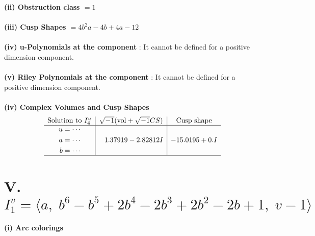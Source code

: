 \documentclass[1p]{elsarticle_modified}
\theoremstyle{definition}
\newcommand{\I}{\sqrt{-1}}
\begin{document}
\flushleft \textbf{(ii) Obstruction class $= 1$}\\~\\
\flushleft \textbf{(iii) Cusp Shapes $= 4 b^2 a-4 b+4 a-12$}\\~\\
\flushleft \textbf{(iv) u-Polynomials at the component} : It cannot be defined for a positive dimension component.\\~\\
\flushleft \textbf{(v) Riley Polynomials at the component} : It cannot be defined for a positive dimension component.\\~\\
\newpage\flushleft \textbf{(iv) Complex Volumes and Cusp Shapes}
$$\begin{array}{c|c|c} 
\text{Solution to }I^u_{4}& \I (\text{vol} + \sqrt{-1}CS) & \text{Cusp shape}\\
 \hline 
\begin{aligned}
u &= \cdots \\
a &= \cdots \\
b &= \cdots\end{aligned}
 & \phantom{-}1.37919 - 2.82812 I & -15.0195 + 0. I\\
 \hline 
 \end{array}
$$\newpage\renewcommand{\arraystretch}{1}
\centering \section*{V. $I^v_{1}= \langle a,\;b^6- b^5+2 b^4-2 b^3+2 b^2-2 b+1,\;v-1 \rangle$}
\flushleft \textbf{(i) Arc colorings}\\
\end{document}
